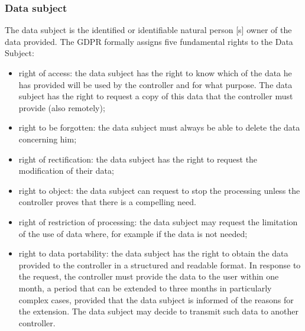 \subsubsection{Data subject}
The data subject is the identified or identifiable natural person [s] owner of the data provided. The GDPR formally assigns five fundamental rights to the Data Subject:
\begin{itemize}
    \item right of access: the data subject has the right to know which of the data he has provided will be used by the controller and for what purpose. The data subject has the right to request a copy of this data that the controller must provide (also remotely);
    \item right to be forgotten: the data subject must always be able to delete the data concerning him;
    \item right of rectification: the data subject has the right to request the modification of their data;
    \item right to object: the data subject can request to stop the processing unless the controller proves that there is a compelling need.
    \item right of restriction of processing: the data subject may request the limitation of the use of data where, for example if the data is not needed;
    \item right to data portability: the data subject has the right to obtain the data provided to the controller in a structured and readable format. In response to the request, the controller must provide the data to the user within one month, a period that can be extended to three months in particularly complex cases, provided that the data subject is informed of the reasons for the extension. The data subject may decide to transmit such data to another controller.
\end{itemize}
